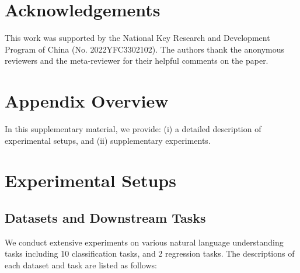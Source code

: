 \documentclass[letterpaper]{article} %
\begin{document}
\section*{Acknowledgements} 
This work was supported by the National Key Research and Development Program of China (No. 2022YFC3302102).
The authors thank the anonymous reviewers and the meta-reviewer for their helpful comments on the paper.




\clearpage
\appendix

\section*{Appendix Overview}
In this supplementary material, we provide: 
(i) a detailed description of experimental setups,
and (ii) supplementary experiments.

\section{Experimental Setups}
\subsection{Datasets and Downstream Tasks} 

We conduct extensive experiments on various natural language understanding tasks including 10 classification  tasks, and 2 regression tasks. The descriptions of each dataset and task are listed as follows:
\end{document}
